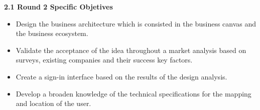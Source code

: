 \documentclass[]{article}
\begin{document}
\Large{
\textbf{2.1 Round 2 Specific Objetives}\\
}
\begin{itemize}
	\item Design the business architecture which is consisted in the business canvas and the business ecosystem.
	\item Validate the acceptance of the idea throughout a market analysis based on surveys, existing companies and 		their success key factors.
	\item Create a sign-in interface based on the results of the design analysis. 
	\item Develop a broaden knowledge of the technical specifications for the mapping and location of the user. 
	
\end{itemize}
\end{document}
